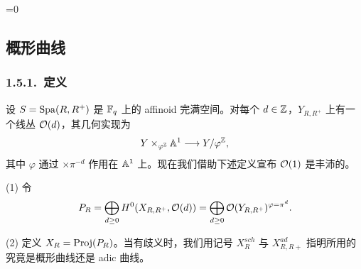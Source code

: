 

\ifnum\value{section}=0\relax
  \setcounter{section}{1}%
  \setcounter{theorem}{23}%
  \setcounter{equation}{5}%
\fi

\subsection{概形曲线}%

\subsubsection*{1.5.1.\ 定义}

设 $S=\Spa(R,R^+)$ 是 $\FF_q$ 上的 affinoid 完满空间。对每个 $d\in\ZZ$，$Y_{R,R^+}$ 上有一个线丛 $\oo(d)$，其几何实现为
\[
Y\times_{\varphi^{\ZZ}}\AA^1\longrightarrow Y/\varphi^{\ZZ},
\]
其中 $\varphi$ 通过 $\times\pi^{-d}$ 作用在 $\AA^1$ 上。现在我们借助下述定义宣布 $\oo(1)$ 是丰沛的。

\begin{definition}\label{def:1.24}
(1) 令
\[
P_R=\bigoplus_{d\ge 0}H^0(X_{R,R^+},\oo(d))=\bigoplus_{d\ge 0}\oo(Y_{R,R^+})^{\varphi=\pi^d}.
\]

(2) 定义 $X_R=\Proj(P_R)$。当有歧义时，我们用记号 $X_R^{sch}$ 与 $X^{ad}_{R,R+}$ 指明所用的究竟是概形曲线还是 adic 曲线。
\end{definition}

